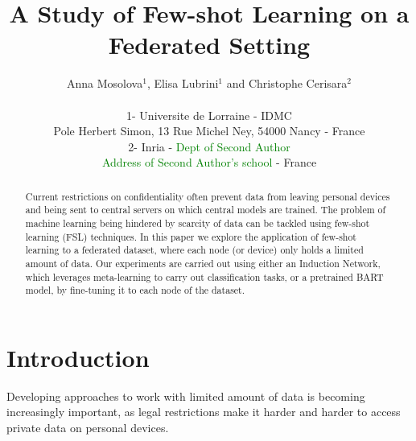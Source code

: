 \documentclass{esannV2}
\begin{document}
\title{A Study of Few-shot Learning on a Federated Setting}


\author{Anna Mosolova$^1$, Elisa Lubrini$^1$ and Christophe Cerisara$^2$ 

\vspace{.3cm}\\
%
1- Universite de Lorraine - IDMC \\
Pole Herbert Simon, 13 Rue Michel Ney, 54000 Nancy - France
%
\vspace{.1cm}\\
2- Inria - \textcolor{green}{Dept of Second Author} \\
\textcolor{green}{Address of Second Author's school} - France\\
}

\maketitle

\begin{abstract}
Current restrictions on confidentiality often prevent data from leaving personal devices and being sent to central servers on which central models are trained. The problem of machine learning being hindered by scarcity of data can be tackled using few-shot learning (FSL) techniques. In this paper we explore the application of few-shot learning to a federated dataset, where each node (or device) only holds a limited amount of data. Our experiments are carried out using either an Induction Network, which leverages meta-learning to carry out classification tasks, or a pretrained BART model, by fine-tuning it to each node of the dataset.
\end{abstract}




\section{Introduction}
Developing approaches to work with limited amount of data is becoming increasingly important, as legal restrictions make it harder and harder to access private data on personal devices.
\end{document}
